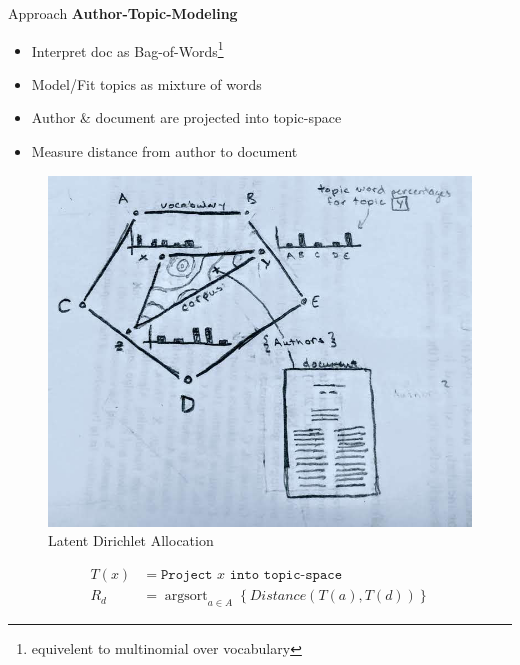 \documentclass[10pt]{beamer}
\DeclareMathOperator*{\argsort}{argsort}
\begin{document}
\begin{frame}{Approach}
  {\bf Author-Topic-Modeling}


  \begin{multicols}{2}

  \begin{itemize}
  \item Interpret doc as Bag-of-Words\footnote{equivelent to multinomial over vocabulary}
  \item Model/Fit topics as mixture of words
  \item Author \& document are projected into topic-space
  \item Measure distance from author to document
  \end{itemize}

  \begin{figure}
  \includegraphics[width=\columnwidth]{./lda-draw.jpg}
  \caption{Latent Dirichlet Allocation}
  \end{figure}

  \end{multicols}

  \vspace{-2em}
  \begin{align*}
    T(x) &= \texttt{Project $x$ into topic-space} \\
    R_d &= \argsort_{a\in A} \left\{Distance(T(a),T(d))\right\}
  \end{align*}

\end{frame}
\end{document}
